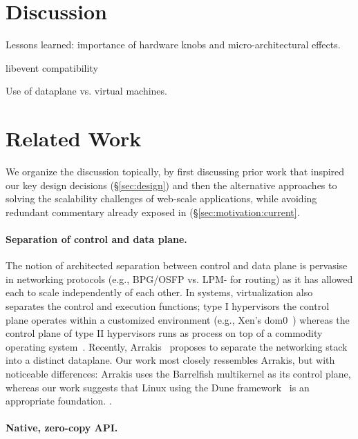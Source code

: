 

\section{Discussion}

\todo Lessons learned: importance of hardware knobs and micro-architectural effects.

\todo libevent compatibility

\todo Use of dataplane vs. virtual machines. 

\section{Related Work}

We organize the discussion topically, by first discussing prior work
that inspired our key design decisions (\S\ref{sec:design}) and then
the alternative approaches to solving the scalability challenges of
web-scale applications, while avoiding redundant commentary already
exposed in (\S\ref{sec:motivation:current}.


\paragraph{Separation of control and data plane.}

The notion of architected separation between control and data plane is
pervasise in networking protocols (e.g., BPG/OSFP vs. LPM- for
routing) as it has allowed each to scale independently of each other.
In systems, virtualization also separates the control and execution
functions; type I hypervisors the control plane operates within a
customized environment (e.g., Xen's
dom0~\cite{DBLP:conf/sosp/BarhamDFHHHN03}) whereas the control plane
of type II hypervisors runs as process on top of a commodity operating
system~\cite{DBLP:journals/tocs/BugnionDRSW12}.  Recently,
Arrakis~\cite{peter2013arrakis,arrakisTR13} proposes to separate the
networking stack into a distinct dataplane.  Our work most closely
ressembles Arrakis, but with noticeable differences: Arrakis uses the
Barrelfish multikernel as its control plane, whereas our work suggests
that Linux using the Dune framework~\cite{belay2012dune} is an
appropriate foundation.  .


\paragraph{Native, zero-copy API.}


